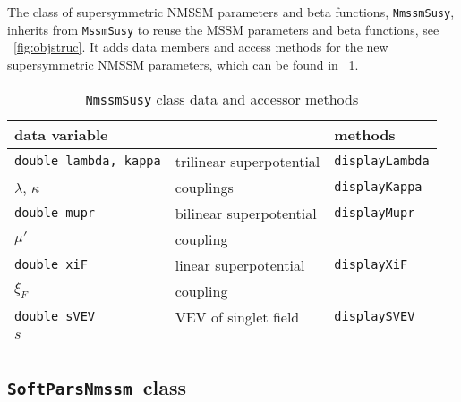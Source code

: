 \documentclass[final,3p,times,pdflatex]{elsarticle}
\def\code#1{\small{\tt #1}\normalsize}
\begin{document}
The class of supersymmetric NMSSM parameters and beta functions,
\code{NmssmSusy}, inherits from \code{MssmSusy} to reuse the MSSM
parameters and beta functions, see \figurename~\ref{fig:objstruc}.  It
adds data members and access methods for the new supersymmetric NMSSM
parameters, which can be found in \tablename~\ref{tab:nmssmsusy}.
%
\begin{table}
  \centering
  \begin{tabular}{lll}
    data variable & & methods \\\hline
    \code{\small double lambda, kappa} & trilinear superpotential &
    \code{\small displayLambda}
    \\
    $\lambda$, $\kappa$ & couplings & \code{\small displayKappa}
    \\\hline
    \code{\small double mupr} & bilinear superpotential &
    \code{\small displayMupr}
    \\
    $\mu'$ & coupling &
    \\\hline
    \code{\small double xiF} & linear superpotential &
    \code{\small displayXiF}
    \\
    $\xi_F$ & coupling &
    \\\hline
    \code{\small double sVEV} & VEV of singlet field &
    \code{\small displaySVEV}
    \\
    $s$ & &
    \\\hline
    \normalsize
  \end{tabular}
  \caption{\code{NmssmSusy} class data and accessor methods
    \label{tab:nmssmsusy}}
\end{table}

\subsection{\code{SoftParsNmssm}~class}
\label{nmssmsoftpars}
\end{document}
